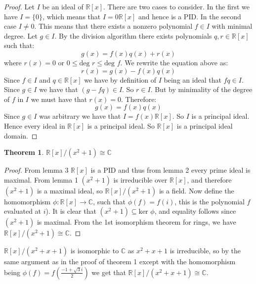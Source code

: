 \documentclass{article}
\newtheorem{theorem}{Theorem}
\theoremstyle{definition}
\begin{document}
\begin{proof}
Let $I$ be an ideal of $\mathbb{R}[x]$. There are two cases to consider. In the first we have $I=\{0\}$, which means that $I=0\mathbb{R}[x]$ and hence is a PID. In the second case $I\neq0$. This means that there exists a nonzero polynomial $f\in I$ with minimal degree. Let $g\in I$. By the division algorithm there exists polynomials $q,r\in\mathbb{R}[x]$ such that:
$$g(x)=f(x)q(x)+r(x)$$
where $r(x)=0$ or $0\leq \text{deg }r\leq\text{deg }f$. We rewrite the equation above as:
$$r(x)=g(x)-f(x)q(x)$$
Since $f\in I$ and $q\in\mathbb{R}[x]$ we have by definition of $I$ being an ideal that $fq\in I$. Since $g\in I$ we have that $(g-fq)\in I$. So $r\in I$. But by minimality of the degree of $f$ in $I$ we must have that $r(x)=0$. Therefore:
$$g(x)=f(x)q(x)$$
Since $g\in I$ was arbitrary we have that $I=f(x)\mathbb{R}[x]$. So $I$ is a principal ideal. Hence every ideal in $\mathbb{R}[x]$ is a principal ideal. So $\mathbb{R}[x]$ is a principal ideal domain.
\end{proof}
\begin{theorem}
$\mathbb{R}[x]/(x^2 + 1)\cong\mathbb{C}$
\end{theorem}
\begin{proof}
From lemma 3 $\mathbb{R}[x]$ is a PID and thus from lemma 2 every prime ideal is maximal. From lemma 1 $(x^2+1)$ is irreducible over $\mathbb{R}[x]$, and therefore $(x^2+1)$ is a maximal ideal, so $\mathbb{R}[x]/(x^2+1)$ is a field. Now define the homomorphism $\phi:\mathbb{R}[x]\rightarrow\mathbb{C}$, such that $\phi(f)=f(i)$, this is the polynomial $f$ evaluated at $i$). It is clear that $(x^2+1)\subseteq \text{ker }\phi$, and equality follows since $(x^2+1)$ is maximal. From the 1st isomorphism theorem for rings, we have $\mathbb{R}[x]/(x^2+1)\cong\mathbb{C}$.
\end{proof}
\noindent$\mathbb{R}[x]/(x^2 + x + 1)$ is isomorphic to
$\mathbb{C}$ as $x^2+x+1$ is irreducible, so by the same argument as in the proof of theorem 1 except with the homomorphism being $\phi(f)=f\left(\frac{-1+\sqrt{3}i}{2}\right)$ we get that $\mathbb{R}[x]/(x^2 + x + 1)\cong\mathbb{C}$.
\end{document}
